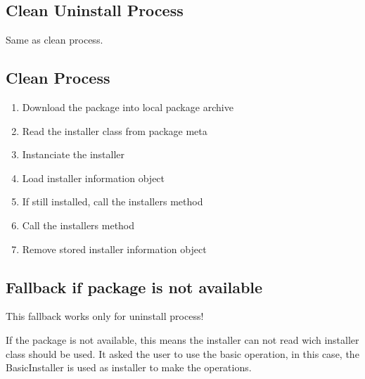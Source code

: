\subsection[sec:clean uninstall process]{Clean Uninstall Process}

Same as clean process.

\subsection[sec:clean process]{Clean Process}

\begin{enumerate}
\item Download the package into local package archive
\item Read the installer class from package meta
\item Instanciate the installer
\item Load installer information object
\item If still installed, call the installers  method
\item Call the installers  method
\item Remove stored installer information object
\end{enumerate}

\subsection[sec:installation process fallback]{Fallback if package is not available}

This fallback works only for uninstall process!

If the package is not available, this means the installer can not read wich installer class should be used.
It asked the user to use the basic operation, in this case, the BasicInstaller is used as installer to make the operations.
